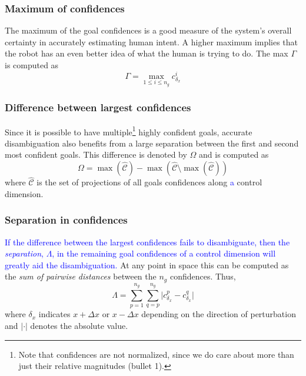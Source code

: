 \documentclass[conference]{IEEEtran}
\begin{document}
\subsubsection{Maximum of confidences}
The maximum of the goal confidences is a good measure of the system's overall certainty in accurately estimating human intent. A higher maximum implies that the robot has an even better idea of what the human is trying to do. The max $\Gamma$ is computed as
\begin{equation*}
\Gamma =\max\limits_{1 \leq i \leq n_g}c^{i}_{\delta_x}
\end{equation*}
\subsubsection{Difference between largest confidences}
Since it is possible to have multiple\footnote{Note that confidences are not normalized, since we do care about more than just their relative magnitudes (bullet 1).} highly confident goals, accurate disambiguation also benefits from a large separation between the first and second most confident goals. 
This difference is denoted by $\Omega$ and is computed as
\begin{equation*}
\Omega = \max(\hat{\mathcal{C}}) - \max(\hat{\mathcal{C}} \setminus {\max(\hat{\mathcal{C}})})
\end{equation*}
where $\hat{\mathcal{C}}$ is the set of projections of all goals confidences along \textcolor{blue}{a} control dimension.
\subsubsection{Separation in confidences}
\textcolor{blue}{If the difference between the largest confidences fails to disambiguate, then the \textit{separation}, $\Lambda$, in the remaining goal confidences of a control dimension will greatly aid the disambiguation.} At any point in space this can be computed as the \textit{sum of pairwise distances} between the $n_g$ confidences.  Thus,
\begin{equation*}
\Lambda = \sum_{p=1}^{n_g}\sum_{q=p}^{n_g}\lvert c^{p}_{\delta_x} - c^{q}_{\delta_x}\rvert
\end{equation*}
where $\delta_x$ indicates $x+\Delta x$ or $x-\Delta x$ depending on the direction of perturbation and $\lvert\cdot\rvert$ denotes the absolute value.
\end{document}
